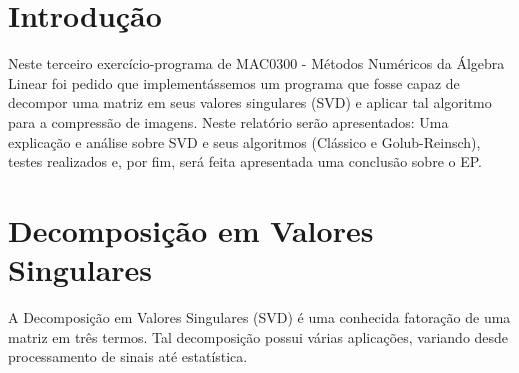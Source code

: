\documentclass[brazil,times]{abnt}
\begin{document}





\data{\today}

\capa

\folhaderosto

\tableofcontents

\chapter{Introdução\label{cap:introducao}}
	Neste terceiro exercício-programa de MAC0300 - Métodos Numéricos da Álgebra Linear foi pedido que implementássemos um programa que fosse capaz de decompor uma matriz em seus valores singulares (SVD) e aplicar tal algoritmo para a compressão de imagens. Neste relatório serão apresentados: Uma explicação e análise sobre SVD e seus algoritmos (Clássico e Golub-Reinsch), testes realizados e, por fim, será feita apresentada uma conclusão sobre o EP.







\chapter{Decomposição em Valores Singulares}
	A Decomposição em Valores Singulares (SVD) é uma conhecida fatoração de uma matriz em três termos. Tal decomposição possui várias aplicações, variando desde processamento de sinais até estatística.
	
\end{document}
